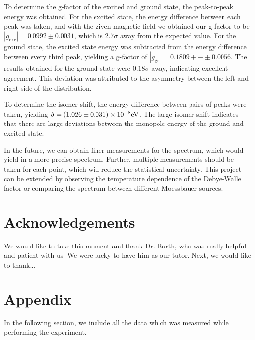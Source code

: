 \documentclass[a4paper]{report}
\numberwithin{equation}{section}
\begin{document}
To determine the g-factor of the excited and ground state, the peak-to-peak energy was obtained. 
For the excited state, the energy difference between each peak was taken, and with the given
magnetic field we obtained our g-factor to be $| g_\mathrm{exc} | = 0.0992 \pm 0.0031$, which is
$2.7\sigma$ away from the expected value. For the ground state, the excited state energy was 
subtracted from the energy difference between every third peak, yielding a g-factor of $| g_\mathrm{gr} | = 0.1809 +-\pm 0.0056$.
The results obtained for the ground state were $0.18\sigma$ away, indicating excellent agreement. This deviation
was attributed to the asymmetry between the left and right side of the distribution. \par 

To determine the isomer shift, the energy difference between pairs of peaks were taken, yielding 
$\delta = \num[scientific-notation=true]{0.1026(31)e-7}\si[]{\electronvolt}$. The large isomer shift
indicates that there are large deviations between the monopole energy of the ground and excited state. \par 

In the future, we can obtain finer measurements for the spectrum, which would yield 
in a more precise spectrum. Further, multiple measurements should be taken for each point, which 
will reduce the statistical uncertainty. This project can be extended by observing the temperature 
dependence of the Debye-Walle factor or comparing the spectrum between different Moessbauer sources.


\chapter{Acknowledgements}
We would like to take this moment and thank Dr. Barth, who was really helpful and patient with us. We were lucky to have him as our tutor. Next, we would like to thank...


\printbibliography

\chapter{Appendix} \label{sec:Appendix}

In the following section, we include all the data which was measured while performing the experiment.
\end{document}
